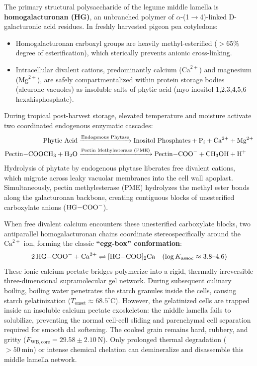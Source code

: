 \documentclass[10pt,a4paper]{article}
\begin{document}
The primary structural polysaccharide of the legume middle lamella is \textbf{homogalacturonan (HG)}, an unbranched polymer of $\alpha$-(1$\rightarrow$4)-linked D-galacturonic acid residues. In freshly harvested pigeon pea cotyledons:
\begin{itemize}[leftmargin=1.5em]
    \item Homogalacturonan carboxyl groups are heavily methyl-esterified ($> 65\%$ degree of esterification), which sterically prevents anionic cross-linking.
    \item Intracellular divalent cations, predominantly calcium ($\mathrm{Ca}^{2+}$) and magnesium ($\mathrm{Mg}^{2+}$), are safely compartmentalized within protein storage bodies (aleurone vacuoles) as insoluble salts of phytic acid (myo-inositol 1,2,3,4,5,6-hexakisphosphate).
\end{itemize}

During tropical post-harvest storage, elevated temperature and moisture activate two coordinated endogenous enzymatic cascades:
\begin{align}
\label{eq:phytase_cleavage}
\ce{Phytic\ Acid} &\xrightarrow{\text{Endogenous Phytase}} \ce{Inositol\ Phosphates} + \ce{P_i} + \ce{Ca^{2+}} + \ce{Mg^{2+}} \\
\label{eq:pme_demethylation}
\ce{Pectin-COOCH3} + \ce{H2O} &\xrightarrow{\text{Pectin Methylesterase (PME)}} \ce{Pectin-COO-} + \ce{CH3OH} + \ce{H+}
\end{align}
Hydrolysis of phytate by endogenous phytase liberates free divalent cations, which migrate across leaky vacuolar membranes into the cell wall apoplast. Simultaneously, pectin methylesterase (PME) hydrolyzes the methyl ester bonds along the galacturonan backbone, creating contiguous blocks of unesterified carboxylate anions ($\ce{HG-COO-}$).

When free divalent calcium encounters these unesterified carboxylate blocks, two antiparallel homogalacturonan chains coordinate stereospecifically around the $\mathrm{Ca}^{2+}$ ion, forming the classic \textbf{``egg-box'' conformation}:
\begin{equation}
\label{eq:egg_box_assoc}
2\,\ce{HG-COO-} + \ce{Ca^{2+}} \rightleftharpoons \ce{[HG-COO]_2Ca} \quad (\log K_{\mathrm{assoc}} \approx 3.8\text{--}4.6)
\end{equation}
These ionic calcium pectate bridges polymerize into a rigid, thermally irreversible three-dimensional supramolecular gel network. During subsequent culinary boiling, boiling water penetrates the starch granules inside the cells, causing starch gelatinization ($T_{\mathrm{onset}} \approx 68.5^\circ\mathrm{C}$). However, the gelatinized cells are trapped inside an insoluble calcium pectate exoskeleton: the middle lamella fails to solubilize, preventing the normal cell-cell sliding and parenchymal cell separation required for smooth dal softening. The cooked grain remains hard, rubbery, and gritty ($F_{\mathrm{WB,core}} = 29.58 \pm 2.10\ \mathrm{N}$). Only prolonged thermal degradation ($> 50\ \mathrm{min}$) or intense chemical chelation can demineralize and disassemble this middle lamella network.
\end{document}
